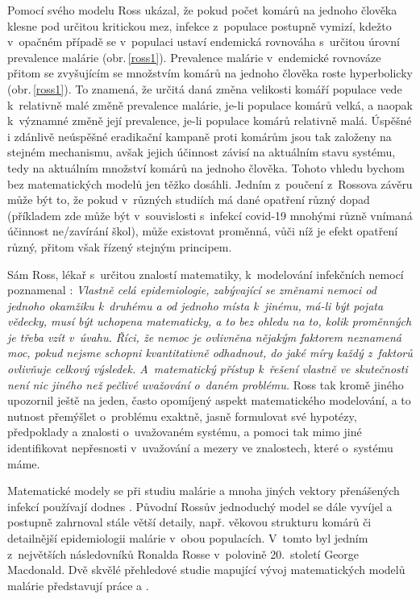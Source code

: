 Pomocí svého modelu \cite{Smith_etal2012} Ross ukázal, že pokud počet komárů na jednoho člověka klesne pod určitou kritickou mez, infekce z~populace postupně vymizí, kdežto v~opačném případě se v~populaci ustaví endemická rovnováha s~určitou úrovní prevalence malárie (obr.\,\ref{ross1}). Prevalence malárie v~endemické rovnováze přitom se zvyšujícím se množstvím komárů na jednoho člověka roste hyperbolicky (obr.\,\ref{ross1}). To znamená, že určitá daná změna velikosti komáří populace vede k~relativně malé změně prevalence malárie, je-li populace komárů velká, a naopak k~významné změně její prevalence, je-li populace komárů relativně malá. Úspěšné i zdánlivě neúspěšné eradikační kampaně proti komárům jsou tak založeny na stejném mechanismu, avšak jejich účinnost závisí na aktuálním stavu systému, tedy na aktuálním množství komárů na jednoho člověka. Tohoto vhledu bychom bez matematických modelů jen těžko dosáhli. Jedním z~poučení z~Rossova závěru může být to, že pokud v~různých studiích má dané opatření různý dopad (příkladem zde může být v~souvislosti s~infekcí covid-19 mnohými různě vnímaná účinnost ne/zavírání škol), může existovat proměnná, vůči níž je efekt opatření různý, přitom však řízený stejným principem. 

Sám Ross, lékař s~určitou znalostí matematiky, k~modelování infekčních nemocí poznamenal \cite{Bacaer2011}: \emph{Vlastně celá epidemiologie, zabývající se změnami nemoci od jednoho okamžiku k~druhému a od jednoho místa k~jinému, má-li být pojata vědecky, musí být uchopena matematicky, a to bez ohledu na to, kolik proměnných je třeba vzít v~úvahu. Říci, že nemoc je ovlivněna nějakým faktorem neznamená moc, pokud nejsme schopni kvantitativně odhadnout, do jaké míry každý z~faktorů ovlivňuje celkový výsledek. A~matematický přístup k~řešení vlastně ve skutečnosti není nic jiného než pečlivé uvažování o~daném problému.} Ross tak kromě jiného upozornil ještě na jeden, často opomíjený aspekt matematického modelování, a to nutnost přemýšlet o~problému exaktně, jasně formulovat své hypotézy, předpoklady a znalosti o~uvažovaném systému, a pomoci tak mimo jiné identifikovat nepřesnosti v~uvažování a mezery ve znalostech, které o~systému máme.     

Matematické modely se při studiu malárie a mnoha jiných vektory přenášených infekcí používají dodnes \cite{Gratz1999,Reiner_etal2012}. Původní Rossův jednoduchý model se dále vyvíjel a postupně zahrnoval stále větší detaily, např. věkovou strukturu komárů či detailnější epidemiologii malárie v~obou populacích. V~tomto byl jedním z~největších následovníků Ronalda Rosse v~polovině 20.\ století George Macdonald. Dvě skvělé přehledové studie mapující vývoj matematických modelů malárie představují práce \cite{Smith_etal2012} a \cite{Smith_etal2018}.

